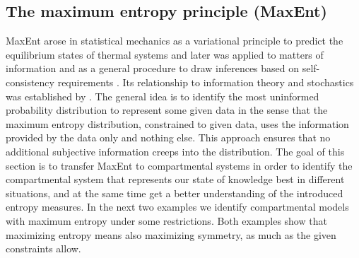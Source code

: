 \documentclass[smallextended]{svjour3}
\begin{document}
\subsection{The maximum entropy principle (MaxEnt)}
MaxEnt arose in statistical mechanics as a variational principle to predict the equilibrium states of thermal systems and later was applied to matters of information and as a general procedure to draw inferences based on self-consistency requirements \citep{Presse2013RMP}.
Its relationship to information theory and stochastics was established by \citet{Jaynes1957PR1, Jaynes1957PR2}.
The general idea is to identify the most uninformed probability distribution to represent some given data in the sense that the maximum entropy distribution, constrained to given data, uses the information provided by the data only and nothing else.
This approach ensures that no additional subjective information creeps into the distribution.
The goal of this section is to transfer MaxEnt to compartmental systems in order to identify the compartmental system that represents our state of knowledge best in different situations, and at the same time get a better understanding of the introduced entropy measures.
In the next two examples we identify compartmental models with maximum entropy under some restrictions.
Both examples show that maximizing entropy means also maximizing symmetry, as much as the given constraints allow.
\end{document}

